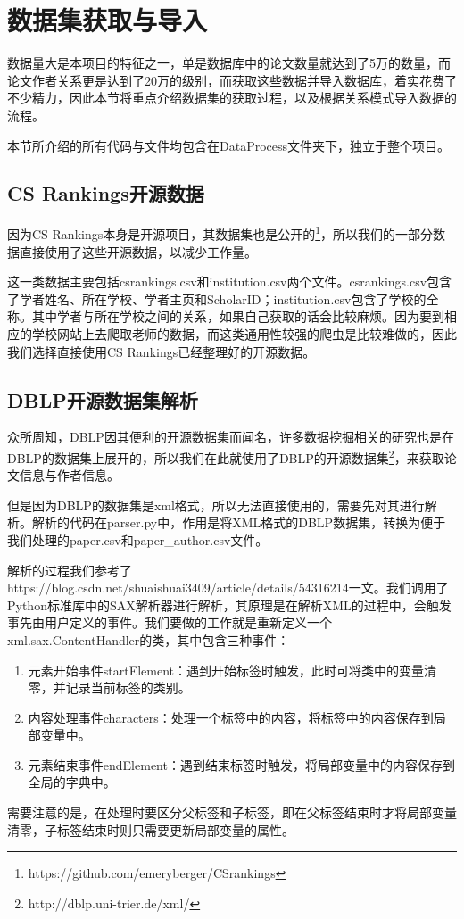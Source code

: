 
\section{数据集获取与导入}

数据量大是本项目的特征之一，单是数据库中的论文数量就达到了5万的数量，而论文作者关系更是达到了20万的级别，而获取这些数据并导入数据库，着实花费了不少精力，因此本节将重点介绍数据集的获取过程，以及根据关系模式导入数据的流程。

本节所介绍的所有代码与文件均包含在DataProcess文件夹下，独立于整个项目。

\subsection{CS Rankings开源数据}

因为CS Rankings本身是开源项目，其数据集也是公开的\footnote{https://github.com/emeryberger/CSrankings}，所以我们的一部分数据直接使用了这些开源数据，以减少工作量。

这一类数据主要包括csrankings.csv和institution.csv两个文件。csrankings.csv包含了学者姓名、所在学校、学者主页和ScholarID；institution.csv包含了学校的全称。其中学者与所在学校之间的关系，如果自己获取的话会比较麻烦。因为要到相应的学校网站上去爬取老师的数据，而这类通用性较强的爬虫是比较难做的，因此我们选择直接使用CS Rankings已经整理好的开源数据。

\subsection{DBLP开源数据集解析}

众所周知，DBLP因其便利的开源数据集而闻名，许多数据挖掘相关的研究也是在DBLP的数据集上展开的，所以我们在此就使用了DBLP的开源数据集\footnote{http://dblp.uni-trier.de/xml/}，来获取论文信息与作者信息。

但是因为DBLP的数据集是xml格式，所以无法直接使用的，需要先对其进行解析。解析的代码在parser.py中，作用是将XML格式的DBLP数据集，转换为便于我们处理的paper.csv和paper\_author.csv文件。

解析的过程我们参考了https://blog.csdn.net/shuaishuai3409/article/details/54316214一文。我们调用了Python标准库中的SAX解析器进行解析，其原理是在解析XML的过程中，会触发事先由用户定义的事件。我们要做的工作就是重新定义一个xml.sax.ContentHandler的类，其中包含三种事件：
\begin{enumerate}
\item 元素开始事件startElement：遇到开始标签时触发，此时可将类中的变量清零，并记录当前标签的类别。
\item 内容处理事件characters：处理一个标签中的内容，将标签中的内容保存到局部变量中。
\item 元素结束事件endElement：遇到结束标签时触发，将局部变量中的内容保存到全局的字典中。
\end{enumerate}
需要注意的是，在处理时要区分父标签和子标签，即在父标签结束时才将局部变量清零，子标签结束时则只需要更新局部变量的属性。

